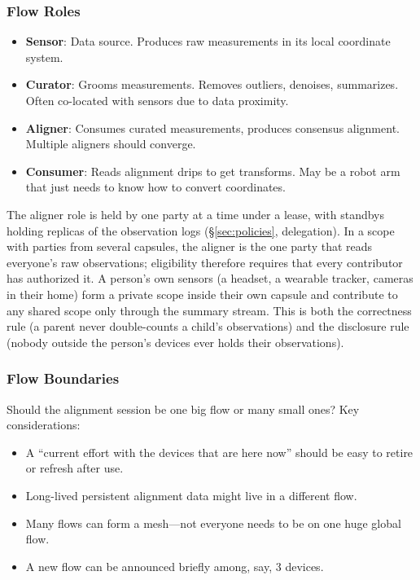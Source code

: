 \documentclass[11pt, letterpaper]{article}
\begin{document}
\subsubsection{Flow Roles}
\begin{itemize}[leftmargin=2em]
  \item \textbf{Sensor}: Data source. Produces raw measurements in its local
    coordinate system.
  \item \textbf{Curator}: Grooms measurements. Removes outliers, denoises, summarizes.
    Often co-located with sensors due to data proximity.
  \item \textbf{Aligner}: Consumes curated measurements, produces consensus alignment.
    Multiple aligners should converge.
  \item \textbf{Consumer}: Reads alignment drips to get transforms. May be a robot arm
    that just needs to know how to convert coordinates.
\end{itemize}

The aligner role is held by one party at a time under a lease, with standbys holding
replicas of the observation logs (\S\ref{sec:policies}, delegation). In a scope with
parties from several capsules, the aligner is the one party that reads everyone's raw
observations; eligibility therefore requires that every contributor has authorized it.
A person's own sensors (a headset, a wearable tracker, cameras in their home) form a
private scope inside their own capsule and contribute to any shared scope only through
the summary stream. This is both the correctness rule (a parent never double-counts a
child's observations) and the disclosure rule (nobody outside the person's devices ever
holds their observations).

\subsubsection{Flow Boundaries}
\label{sec:ex-spatial-boundaries}

Should the alignment session be one big flow or many small ones? Key considerations:

\begin{itemize}[leftmargin=2em]
  \item A ``current effort with the devices that are here now'' should be easy to
    retire or refresh after use.
  \item Long-lived persistent alignment data might live in a different flow.
  \item Many flows can form a mesh---not everyone needs to be on one huge global flow.
  \item A new flow can be announced briefly among, say, 3 devices.
\end{itemize}
\end{document}

